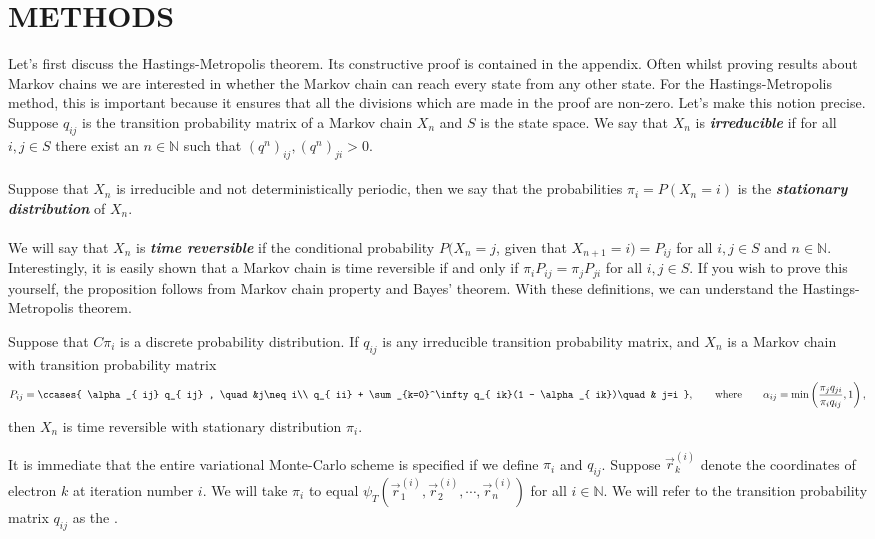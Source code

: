 \documentclass[11pt,english,a4paper]{article}
\begin{document}
\section*{\uppercase{Methods}}
Let's first discuss the Hastings-Metropolis theorem. Its constructive proof is contained in the appendix. Often whilst proving results about Markov chains we are interested in whether the Markov chain can reach every state from any other state. For the Hastings-Metropolis method, this is important because it ensures that all the divisions which are made in the proof are non-zero. Let's make this notion precise. Suppose $q_{  ij}$ is the transition probability matrix of a Markov chain $X_n$ and $S$ is the state space. We say that $X_n$ is \textit{\textbf{irreducible}} if for all $i,j \in S$ there exist an $n \in \mathbb{N}$ such that $(q^n)_{  ij}, (q^n)_{  ji} > 0$.\\
\\
Suppose that $X_n$ is irreducible and not deterministically periodic, then we say that the probabilities $\pi_i = P(X_n = i)$ is the \textit{\textbf{stationary distribution}} of $X_n$.\\
\\
We will say that $X_n$ is \textit{\textbf{time reversible}} if the conditional probability $P(X_{n} = j$, given that $X_{n+1} = i) = P_{  ij}$ for all $i,j \in S$ and $n \in \mathbb{N}$. Interestingly, it is easily shown that a Markov chain is time reversible if and only if $\pi_i P_{  ij} = \pi_j P_{  ji}$ for all $i,j \in S$. If you wish to prove this yourself, the proposition follows from Markov chain property and Bayes' theorem. With these definitions, we can understand the Hastings-Metropolis theorem.
\begin{theorem}
Suppose that $C\pi_i$ is a discrete probability distribution. If $q_{ij}$ is any irreducible transition probability matrix, and $X_n$ is a Markov chain with transition probability matrix 
\begin{equation}
P_{ij} = \ccases {
\alpha_{  ij} q_{  ij} , \quad &j\neq i\\
q_{  ii} + \sum_{k=0}^\infty q_{  ik}(1 - \alpha_{  ik})\quad & j=i
},\qquad \text{where} \qquad \alpha_{  ij} = \min \left( \frac{\pi_j q_{  ji}}{\pi_i q_{  ij}} , 1\right), \label{eq:metropolis}
\end{equation}
then $X_n$ is time reversible with stationary distribution $\pi_i$. \label{thm:metropolis}
\end{theorem}
It is immediate that the entire variational Monte-Carlo scheme is specified if we define $\pi_i$ and $q_{ij}$. Suppose $\vec{r}_k^{(i)}$ denote the coordinates of electron $k$ at iteration number $i$. We will take $\pi_i$ to equal $\psi_T(\vec{r}_1^{(i)},\vec{r}_2^{(i)},\cdots ,\vec{r}_n^{(i)})$ for all $i \in \mathbb{N}$. We will refer to the transition probability matrix $q_{ij}$ as the .\\
\end{document}
